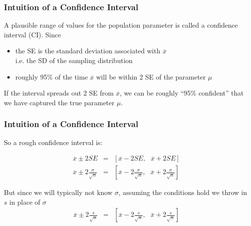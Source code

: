 \documentclass[handout]{beamer}
\newcommand{\blue}[1]{\textcolor{blue2}{#1}}
\newcommand{\xbar}{\overline{x}}
\begin{document}
\begin{frame}[fragile]
\frametitle{Intuition of a Confidence Interval}
A plausible range of values for the population parameter is called a \blue{confidence interval (CI)}.  Since
\begin{itemize}
\pause \item the SE is the standard deviation associated with $\xbar$\\
 i.e. the SD of the sampling distribution
\pause \item roughly 95\% of the time $\xbar$ will be within 2 SE of the parameter $\mu$
\end{itemize}

\pause If the interval spreads out 2 SE from $\xbar$, we can be roughly
\blue{``95\% confident''} that we have captured the true parameter $\mu$.  
\end{frame}




\begin{frame}[fragile]
\frametitle{Intuition of a Confidence Interval}
So a \blue{rough} confidence interval is:

\begin{eqnarray*}
\xbar \pm  2 SE &=& \left[\xbar - 2 SE, \mbox{  }\xbar + 2 SE\right]\\
\xbar \pm 2 \frac{\sigma}{\sqrt{n}} &=& \left[\xbar - 2 \frac{\sigma}{\sqrt{n}}, \mbox{  }\xbar + 2 \frac{\sigma}{\sqrt{n}}\right]
\end{eqnarray*}

\pause But since we will typically not know $\sigma$, assuming the conditions hold we throw in $s$ in place of $\sigma$
\begin{eqnarray*}
\xbar \pm 2 \frac{s}{\sqrt{n}} &=& \left[\xbar - 2 \frac{s}{\sqrt{n}}, \mbox{  }\xbar + 2 \frac{s}{\sqrt{n}}\right]
\end{eqnarray*}



\end{frame}
\end{document}
